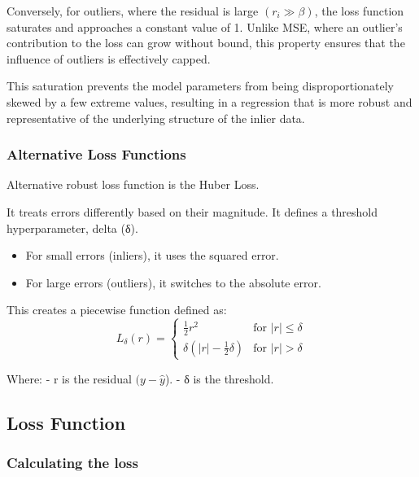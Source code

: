 \documentclass[11pt]{article}
\providecommand{\tightlist}{%
      \setlength{\itemsep}{0pt}\setlength{\parskip}{0pt}}
\begin{document}
Conversely, for outliers, where the residual is large \((r_i​≫β)\), the
loss function saturates and approaches a constant value of 1. Unlike
MSE, where an outlier's contribution to the loss can grow without bound,
this property ensures that the influence of outliers is effectively
capped.

This saturation prevents the model parameters from being
disproportionately skewed by a few extreme values, resulting in a
regression that is more robust and representative of the underlying
structure of the inlier data.

    \subsubsection{Alternative Loss
Functions}\label{alternative-loss-functions}

Alternative robust loss function is the Huber Loss.

It treats errors differently based on their magnitude. It defines a
threshold hyperparameter, delta (δ).

\begin{itemize}
\tightlist
\item
  For small errors (inliers), it uses the squared error.
\item
  For large errors (outliers), it switches to the absolute error.
\end{itemize}

This creates a piecewise function defined as: \[
L_{\delta}(r) =
\begin{cases}
  \frac{1}{2}r^2 & \text{for } |r| \le \delta \\
  \delta\left(|r| - \frac{1}{2}\delta\right) & \text{for } |r| > \delta
\end{cases}
\]

Where: - r is the residual \((y−\hat{y}​\)). - δ is the threshold.

    \subsection{Loss Function}\label{loss-function}

    \subsubsection{Calculating the loss}\label{calculating-the-loss}
\end{document}
